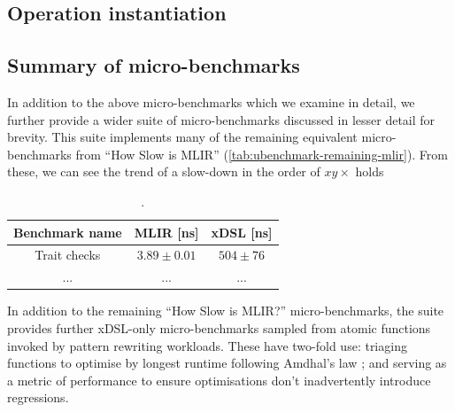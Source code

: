 

\subsection{Operation instantiation}

\subsection{Summary of micro-benchmarks}

In addition to the above micro-benchmarks which we examine in detail, we further provide a wider suite of micro-benchmarks discussed in lesser detail for brevity. %
This suite implements many of the remaining equivalent micro-benchmarks from ``How Slow is MLIR'' (\autoref{tab:ubenchmark-remaining-mlir}).
From these, we can see the trend of a slow-down in the order of $xy\times$ holds

\begin{table}[H]
  \caption{.}
  \label{tab:ubenchmark-remaining-mlir}
  \centering
  \begin{tabular}{ccc}
    \toprule
    \textbf{Benchmark name} & \textbf{MLIR [ns]} & \textbf{xDSL [ns]}\\
    \midrule
    Trait checks & $3.89 \pm 0.01$ & $504 \pm 76$ \\
    ... & ... & ... \\
    \bottomrule
  \end{tabular}
\end{table}


In addition to the remaining ``How Slow is MLIR?'' micro-benchmarks, the suite provides further xDSL-only micro-benchmarks sampled from atomic functions invoked by pattern rewriting workloads. %
These have two-fold use: triaging functions to optimise by longest runtime following Amdhal's law \cite{amdahlValiditySingleProcessor1967}; and serving as a metric of performance to ensure optimisations don't inadvertently introduce regressions.

